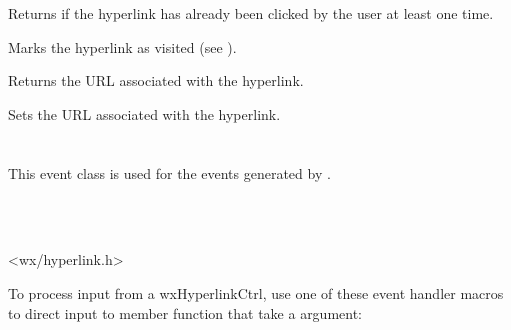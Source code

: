 \label{wxhyperlinkctrlgetvisited}


Returns \true if the hyperlink has already been clicked by the user at least one time.


\label{wxhyperlinkctrlsetvisited}


Marks the hyperlink as visited (see ).


\label{wxhyperlinkctrlgeturl}


Returns the URL associated with the hyperlink.


\label{wxhyperlinkctrlseturl}


Sets the URL associated with the hyperlink.






\section{}\label{wxhyperlinkctrlevent}

This event class is used for the events generated by
.


\\
\\


<wx/hyperlink.h>


To process input from a wxHyperlinkCtrl, use one of these event handler macros to
direct input to member function that take a
 argument:

\twocolwidtha{7cm}
\begin{twocollist}
\end{twocollist}


